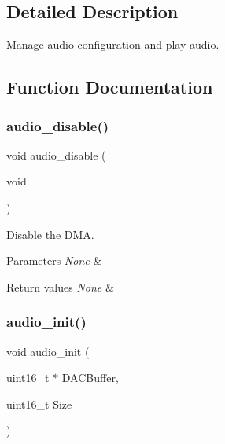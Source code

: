 \subsection{Detailed Description}
Manage audio configuration and play audio. 



\subsection{Function Documentation}
\mbox{\label{group___audio_gafff6cd7f4332d078ce0114143cd30998}} 
\subsubsection{\texorpdfstring{audio\+\_\+disable()}{audio\_disable()}}
{\footnotesize\ttfamily void audio\+\_\+disable (\begin{DoxyParamCaption}\item[{void}]{ }\end{DoxyParamCaption})}



Disable the D\+MA. 


\begin{DoxyParams}{Parameters}
{\em None} & \\
\hline
\end{DoxyParams}

\begin{DoxyRetVals}{Return values}
{\em None} & \\
\hline
\end{DoxyRetVals}
\mbox{\label{group___audio_ga6a621a84280fa05373990982dacce11b}} 
\subsubsection{\texorpdfstring{audio\+\_\+init()}{audio\_init()}}
{\footnotesize\ttfamily void audio\+\_\+init (\begin{DoxyParamCaption}\item[{uint16\+\_\+t $\ast$}]{D\+A\+C\+Buffer,  }\item[{uint16\+\_\+t}]{Size }\end{DoxyParamCaption})}



